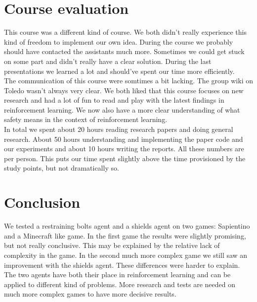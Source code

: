 \documentclass[letterpaper]{article}
\begin{document}
\section{Course evaluation} %
This course was a different kind of course. We both didn't really experience this kind of freedom to implement our own idea. During the course we probably should have contacted the assistants much more. Sometimes we could get stuck on some part
and didn't really have a clear solution. During the last presentations we learned a lot and should've spent our time more efficiently. \\
The communication of this course were somtimes a bit lacking. The group wiki on Toledo wasn't always very clear.
We both liked that this course focuses on new research and had a lot of fun to read and play with the latest findings in reinforcement learning. We now also have a more clear understanding of what safety means in the context of reinforcement learning. \\
In total we spent about 20 hours reading research papers and doing general research. About 50 hours understanding and implementing the paper code and our experiments and about 10 hours writing the reports. All these numbers are per person. This puts our time spent slightly above the time provisioned by the study points, but not dramatically so.


\section{Conclusion}%
We tested a restraining bolts agent and a shields agent on two games: Sapientino and a Minecraft like game. In the first game the results were slightly promising, but not really conclusive. This may be explained by the relative lack of complexity in the game.
In the second much more complex game we still saw an improvement with the shields agent. These differences were harder to explain. The two agents have both their place in reinforcement learning and can be applied to different kind of problems. More research and tests are needed on much more complex games to have more decisive results. 


\nocite{*}


\end{document}
